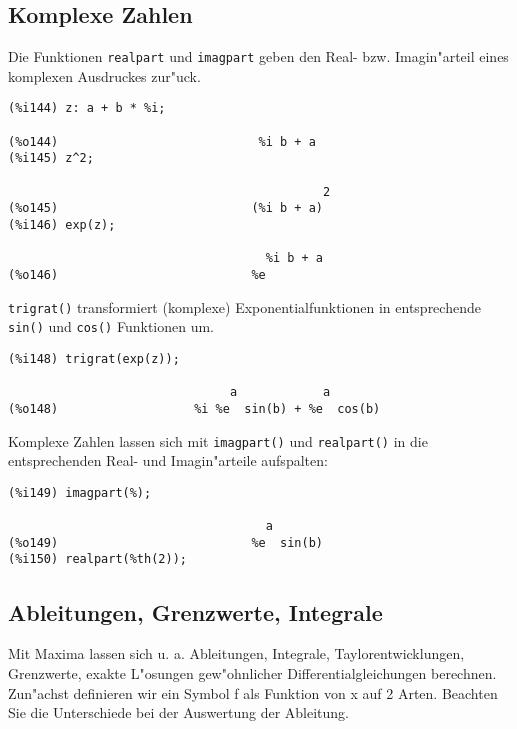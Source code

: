 \documentclass[spanish,12pt,a4paper]{article}
\begin{document}
\subsection{Komplexe Zahlen}


Die Funktionen \verb|realpart| und \verb|imagpart| geben den Real- bzw. Imagin"arteil eines komplexen Ausdruckes zur"uck.

\scriptsize
\begin{verbatim}
(%i144) z: a + b * %i;

(%o144)                            %i b + a
(%i145) z^2;

                                            2
(%o145)                           (%i b + a)
(%i146) exp(z);

                                    %i b + a
(%o146)                           %e
\end{verbatim}
\normalsize

\verb|trigrat()| transformiert (komplexe) Exponentialfunktionen in entsprechende \verb|sin()| und \verb|cos()| Funktionen um.

\scriptsize
\begin{verbatim}
(%i148) trigrat(exp(z));

                               a            a
(%o148)                   %i %e  sin(b) + %e  cos(b)
\end{verbatim}
\normalsize

Komplexe Zahlen lassen sich mit \verb|imagpart()| und \verb|realpart()| in die entsprechenden Real- und Imagin"arteile aufspalten:

\scriptsize
\begin{verbatim}
(%i149) imagpart(%);

                                    a
(%o149)                           %e  sin(b)
(%i150) realpart(%th(2));
\end{verbatim}
\normalsize


\subsection{Ableitungen, Grenzwerte, Integrale}


Mit Maxima lassen sich u. a. Ableitungen, Integrale, Taylorentwicklungen, Grenzwerte, exakte L"osungen gew"ohnlicher Differentialgleichungen berechnen.
Zun"achst definieren wir ein Symbol f als Funktion von x auf 2 Arten. Beachten Sie die Unterschiede bei der Auswertung der Ableitung.
\end{document}
